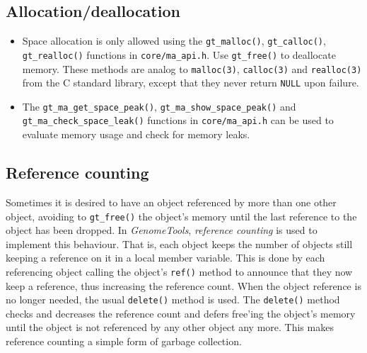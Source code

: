 \documentclass[11pt,final]{article}
\newcommand{\keyword}[1]{\lstinline{#1}}
\newcommand{\Gt}[0]{\emph{GenomeTools}\xspace}
\begin{document}
\subsection{Allocation/deallocation}
\begin{itemize}
\item
Space allocation is only allowed using the \keyword{gt_malloc()}, \keyword{gt_calloc()},
\keyword{gt_realloc()} functions in \keyword{core/ma_api.h}. Use \keyword{gt_free()} to
deallocate memory.
These methods are analog to \keyword{malloc(3)}, \keyword{calloc(3)} and
\keyword{realloc(3)} from the C standard library, except that they never return
\keyword{NULL} upon failure.
\item 
The \keyword{gt_ma_get_space_peak()}, \keyword{gt_ma_show_space_peak()} and
\keyword{gt_ma_check_space_leak()} functions in \keyword{core/ma_api.h} can be
used to evaluate memory usage and check for memory leaks.
\end{itemize}

\subsection{Reference counting}
Sometimes it is desired to have an object referenced by more than one other
object, avoiding to \keyword{gt_free()} the object's memory until the last
reference to the object has been dropped. In \Gt, \emph{reference counting} is
used to implement this behaviour. That is, each object keeps the number of
objects still keeping a reference on it in a local member variable. This is done
by each referencing object calling the object's \keyword{ref()} method to
announce that they now keep a reference, thus increasing the reference count.
When the object reference is no longer needed, the usual \keyword{delete()}
method is used. The \keyword{delete()} method checks and decreases the
reference count and defers free'ing the object's memory until the object is not
referenced by any other object any more. This makes reference counting a simple
form of garbage collection.
\end{document}
